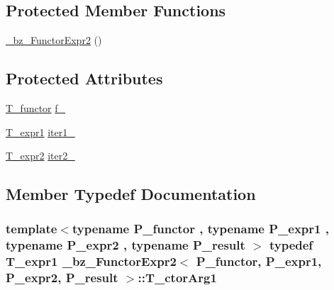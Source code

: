 \subsection*{Protected Member Functions}
\begin{DoxyCompactItemize}
\item 
\hyperlink{class__bz__FunctorExpr2_acfc6796f2dfde79005bb57f5d2b3c5de}{\+\_\+bz\+\_\+\+Functor\+Expr2} ()
\end{DoxyCompactItemize}
\subsection*{Protected Attributes}
\begin{DoxyCompactItemize}
\item 
\hyperlink{class__bz__FunctorExpr2_a3fe23ec6c06a2346710d4590986bc1ae}{T\+\_\+functor} \hyperlink{class__bz__FunctorExpr2_aadc2647a043631e9cc665eda01716651}{f\+\_\+}
\item 
\hyperlink{class__bz__FunctorExpr2_ab18a816b647c4ec928bdd1b61646abfd}{T\+\_\+expr1} \hyperlink{class__bz__FunctorExpr2_aa20ecd4ec9e978c65911a9727f1ca963}{iter1\+\_\+}
\item 
\hyperlink{class__bz__FunctorExpr2_af1371d32263c82261e4b24f3229af6ee}{T\+\_\+expr2} \hyperlink{class__bz__FunctorExpr2_a1dbd4eaa6ff6ccf9bc00fb6d1634a15b}{iter2\+\_\+}
\end{DoxyCompactItemize}


\subsection{Member Typedef Documentation}
\hypertarget{class__bz__FunctorExpr2_a6c13c1ebdee4d6a2a9e5d42a44d6af30}{}
\subsubsection[{T\+\_\+ctor\+Arg1}]{\setlength{\rightskip}{0pt plus 5cm}template$<$typename P\+\_\+functor , typename P\+\_\+expr1 , typename P\+\_\+expr2 , typename P\+\_\+result $>$ typedef {\bf T\+\_\+expr1} {\bf \+\_\+bz\+\_\+\+Functor\+Expr2}$<$ P\+\_\+functor, P\+\_\+expr1, P\+\_\+expr2, P\+\_\+result $>$\+::{\bf T\+\_\+ctor\+Arg1}}\label{class__bz__FunctorExpr2_a6c13c1ebdee4d6a2a9e5d42a44d6af30}
\hypertarget{class__bz__FunctorExpr2_aec9632e49bce5ab5259447ba414f4726}{}
